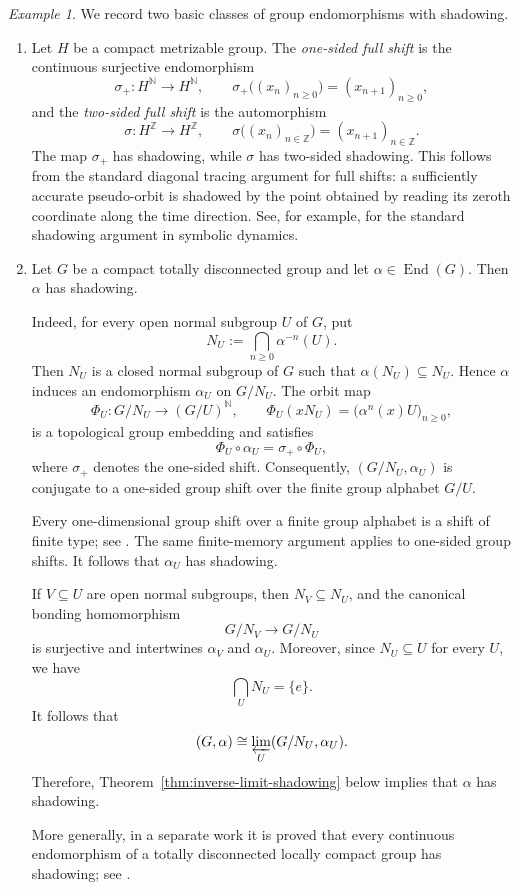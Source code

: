 \documentclass[12pt]{amsart}
\theoremstyle{definition}
\numberwithin{equation}{section}
\theoremstyle{remark}
\newtheorem{example}[theorem]{Example}
\def\End{\operatorname{End}}
\begin{document}
\begin{example}\label{examples}
 We record two basic classes of group endomorphisms with shadowing. 
 \begin{enumerate} 
 \item Let $H$ be a compact metrizable group. The \emph{one-sided full shift} is the continuous surjective endomorphism 
 \[
  \sigma_+:H^{\mathbb N}\to H^{\mathbb N}, \qquad \sigma_+\bigl((x_n)_{n\geq0}\bigr) = (x_{n+1})_{n\geq0}, 
  \] 
 and the \emph{two-sided full shift} is the automorphism 
 \[ 
 \sigma:H^{\mathbb Z}\to H^{\mathbb Z}, \qquad \sigma\bigl((x_n)_{n\in\mathbb Z}\bigr) = (x_{n+1})_{n\in\mathbb Z}.
  \] 
  The map $\sigma_+$ has shadowing, while $\sigma$ has two-sided shadowing. 
  This follows from the standard diagonal tracing argument for full shifts: a sufficiently accurate pseudo-orbit is shadowed by the point obtained by reading its zeroth coordinate along the time direction. See, for example, \cite{AH,Pilyugin} for the standard shadowing argument in symbolic dynamics. 

\item Let $G$ be a compact totally disconnected group and let
$\alpha\in\End(G)$. Then $\alpha$ has shadowing.

Indeed, for every open normal subgroup $U$ of $G$, put
\[
N_U:=\bigcap_{n\geq0}\alpha^{-n}(U).
\]
Then $N_U$ is a closed normal subgroup of $G$ such that
$\alpha(N_U)\subseteq N_U$. Hence $\alpha$ induces an endomorphism
$\alpha_U$ on $G/N_U$. The orbit map
\[
\Phi_U:G/N_U\longrightarrow (G/U)^{\mathbb N},
\qquad
\Phi_U(xN_U)
=
\bigl(\alpha^n(x)U\bigr)_{n\geq0},
\]
is a topological group embedding and satisfies
\[
\Phi_U\circ\alpha_U=\sigma_+\circ\Phi_U,
\]
where $\sigma_+$ denotes the one-sided shift. Consequently,
$(G/N_U,\alpha_U)$ is conjugate to a one-sided group shift over the
finite group alphabet $G/U$.

Every one-dimensional group shift over a finite group alphabet is a
shift of finite type; see \cite{KitchensSchmidt,Schmidt}. The same finite-memory
argument applies to one-sided group shifts. It follows that
$\alpha_U$ has shadowing.

If $V\subseteq U$ are open normal subgroups, then
$N_V\subseteq N_U$, and the canonical bonding homomorphism
\[
G/N_V\longrightarrow G/N_U
\]
is surjective and intertwines $\alpha_V$ and $\alpha_U$. Moreover,
since $N_U\subseteq U$ for every $U$, we have
\[
\bigcap_U N_U=\{e\}.
\]
It follows that
\[
(G,\alpha)
\cong
\varprojlim_U (G/N_U,\alpha_U).
\]
Therefore, Theorem~\ref{thm:inverse-limit-shadowing} below implies that
$\alpha$ has shadowing.

More generally, in a separate work it is proved that every
continuous endomorphism of a totally disconnected locally compact
group has shadowing; see \cite{PengLC}.
   \end{enumerate} 
  \end{example}
\end{document}
